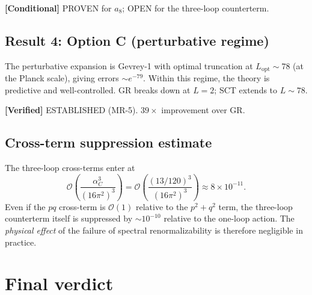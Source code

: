 \documentclass[11pt,a4paper]{article}
\newcommand{\order}{\mathcal{O}}
\theoremstyle{definition}
\newcommand{\verified}[1]{%
  \par\smallskip\noindent
  \colorbox{green!10}{\parbox{\dimexpr\linewidth-2\fboxsep}{%
    \textcolor{proven}{\textbf{[Verified]}} #1}}%
  \par\smallskip}
\newcommand{\condbox}[1]{%
  \par\smallskip\noindent
  \colorbox{yellow!10}{\parbox{\dimexpr\linewidth-2\fboxsep}{%
    \textcolor{conditional}{\textbf{[Conditional]}} #1}}%
  \par\smallskip}
\begin{document}
\condbox{\textcolor{proven}{PROVEN} for $a_8$; \textcolor{open}{OPEN} for the
three-loop counterterm.}

\subsection{Result 4: Option C (perturbative regime)}

The perturbative expansion is Gevrey-1 with optimal truncation at
$L_{\mathrm{opt}} \sim 78$ (at the Planck scale), giving errors
$\sim e^{-79}$.  Within this regime, the theory is predictive and
well-controlled.  GR breaks down at $L = 2$; SCT extends to $L \sim 78$.

\verified{\textcolor{proven}{ESTABLISHED} (MR-5).  $39\times$ improvement over
GR.}

\subsection{Cross-term suppression estimate}

The three-loop cross-terms enter at
\begin{equation}\label{eq:suppression}
  \order\!\left(\frac{\alpha_C^3}{(16\pi^2)^3}\right)
  = \order\!\left(\frac{(13/120)^3}{(16\pi^2)^3}\right)
  \approx 8 \times 10^{-11}.
\end{equation}
Even if the $pq$ cross-term is $\order(1)$ relative to the $p^2 + q^2$ term,
the three-loop counterterm itself is suppressed by $\sim 10^{-10}$ relative to
the one-loop action.  The \emph{physical effect} of the failure of spectral
renormalizability is therefore negligible in practice.


\section{Final verdict}\label{sec:verdict}
\end{document}

